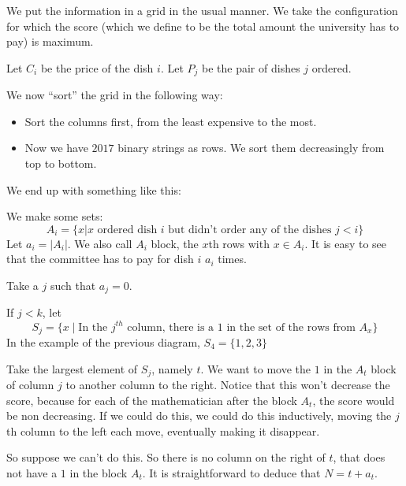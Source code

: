 	\begin{solution}
			We put the information in a grid in the usual manner. We take the configuration for which the score (which we define to be the total amount the university has to pay) is maximum.
			
			\begin{solution_def}
				Let $ C_i $ be the price of the dish $ i $. Let $ P_j $ be the pair of dishes $ j $ ordered.
			\end{solution_def}
			
			We now ``sort'' the grid in the following way:
			\begin{itemize}
				\item Sort the columns first, from the least expensive to the most.
				\item Now we have $ 2017 $ binary strings as rows. We sort them decreasingly from top to bottom.
			\end{itemize}
		
			We end up with something like this:
			
			\begin{solution_def}
				We make some sets:\[ A_i=\{x| x \text{ ordered dish } i \text{ but didn't order any of the dishes } j<i\} \]Let $ a_i = |A_i| $.
				We also call $ A_i $ block, the $ x $th rows with $ x\in A_i $. It is easy to see that the committee has to pay for dish $ i $ $ a_i $ times.
			\end{solution_def}
		
			Take a $ j $ such that $ a_j=0 $.
			 
			If $ j<k $, let \[S_j = \{x\mid \text{In the } j^{th} \text{ column, there is a } 1 \text{ in the set of the rows from } A_x \}\]
			In the example of the previous diagram, $ S_4 = \{1, 2, 3\} $
			
			Take the largest element of $ S_j $, namely $ t $. We want to move the $ 1 $ in the $ A_t $ block of column $ j $ to another column to the right. Notice that this won't decrease the score, because for each of the mathematician after the block $ A_t $, the score would be non decreasing. If we could do this, we could do this inductively, moving the $ j $th column to the left each move, eventually making it disappear. 
			
			So suppose we can't do this. So there is no column on the right of $ t $, that does not have a $ 1 $ in the block $ A_t $. It is straightforward to deduce that $ N=t+a_t $. 
			

\end{solution}
